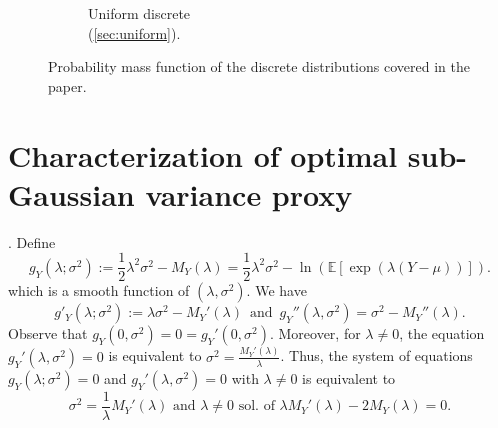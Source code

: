 \documentclass[a4paper, 10pt]{article}
\newcommand{\beq}{\begin{equation}}
\newcommand{\eeq}{\end{equation}}
\theoremstyle{definition}
\begin{document}
\begin{figure}[h!]
\begin{subfigure}{0.3\textwidth}
    \caption{Uniform discrete\\ (\autoref{sec:uniform}).}
    \label{fig:uniform-discrete}
    \end{subfigure}
    \caption{Probability mass function of the discrete distributions covered in the paper.}
    \label{fig:distrib-plots}
\end{figure}



\section{Characterization of optimal sub-Gaussian variance proxy}\label{sec:charac}

.
Define
\beq g_Y(\lambda;\sigma^2):=\frac{1}{2}\lambda^2\sigma^2- M_Y(\lambda)= \frac{1}{2}\lambda^2\sigma^2-\ln \left(\mathbb{E}[\exp(\lambda (Y - \mu))]\right).\eeq
which is a smooth function of $(\lambda,\sigma^2)$.
We have
\beq g'_Y(\lambda;\sigma^2):= \lambda\sigma^2- M_Y'(\lambda) \, \text{ and } \, g_Y''(\lambda,\sigma^2)=\sigma^2-M_Y''(\lambda).\eeq
Observe that $g_Y(0,\sigma^2)=0=g_Y'(0,\sigma^2)$. Moreover, for $\lambda\neq 0$, the equation $g_Y'(\lambda,\sigma^2)=0$ is equivalent to $\sigma^2=\frac{M_Y'(\lambda)}{\lambda} $. Thus, the system of equations $g_Y(\lambda;\sigma^2)=0$ and $g_Y'(\lambda,\sigma^2)=0$ with $\lambda\neq 0$ is equivalent to  
\beq \sigma^2=\frac{1}{\lambda} M_Y'(\lambda) \text{ and } \lambda\neq 0 \text{ sol. of  } \lambda M_Y'(\lambda)- 2M_Y(\lambda)=0.\eeq
\end{document}
